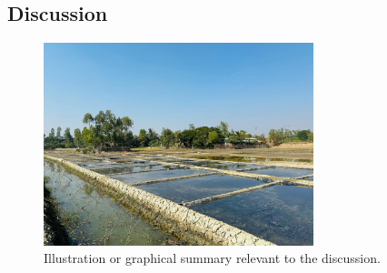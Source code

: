 \begin{adjustwidth}{0.35\textwidth}{0pt}
\section*{Discussion}
\lipsum[7-8]
\end{adjustwidth}

\vspace{1em}
\begin{figure}[H]
  \centering
  \includegraphics[width=0.7\textwidth]{images/discussion-figure.png}
  \caption{Illustration or graphical summary relevant to the discussion.}
  \label{fig:discussion-figure}
\end{figure}
\vspace{1em}
